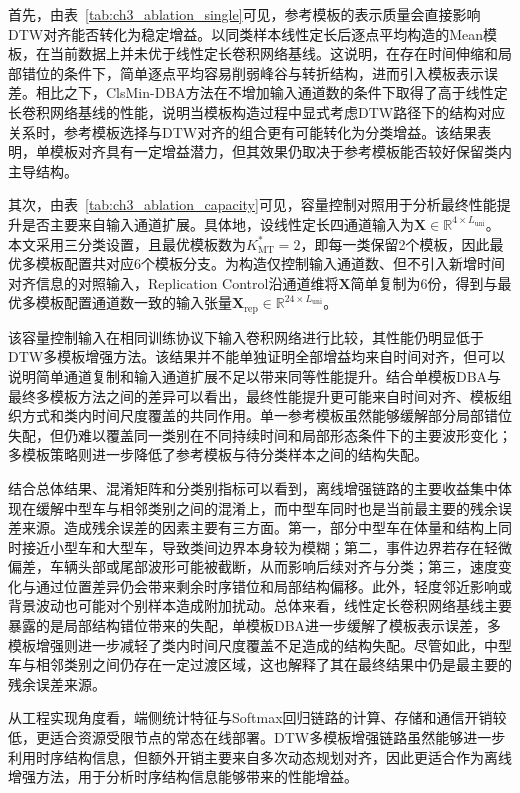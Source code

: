 \documentclass{xdupgthesis}
\begin{document}
首先，由表~\ref{tab:ch3_ablation_single}可见，参考模板的表示质量会直接影响DTW对齐能否转化为稳定增益。以同类样本线性定长后逐点平均构造的Mean模板，在当前数据上并未优于线性定长卷积网络基线。这说明，在存在时间伸缩和局部错位的条件下，简单逐点平均容易削弱峰谷与转折结构，进而引入模板表示误差。相比之下，ClsMin-DBA方法在不增加输入通道数的条件下取得了高于线性定长卷积网络基线的性能，说明当模板构造过程中显式考虑DTW路径下的结构对应关系时，参考模板选择与DTW对齐的组合更有可能转化为分类增益。该结果表明，单模板对齐具有一定增益潜力，但其效果仍取决于参考模板能否较好保留类内主导结构。

其次，由表~\ref{tab:ch3_ablation_capacity}可见，容量控制对照用于分析最终性能提升是否主要来自输入通道扩展。具体地，设线性定长四通道输入为$\mathbf{X}\in\mathbb{R}^{4\times L_{\mathrm{uni}}}$。本文采用三分类设置，且最优模板数为$K_{\mathrm{MT}}^\ast=2$，即每一类保留2个模板，因此最优多模板配置共对应6个模板分支。为构造仅控制输入通道数、但不引入新增时间对齐信息的对照输入，Replication Control沿通道维将$\mathbf{X}$简单复制为6份，得到与最优多模板配置通道数一致的输入张量$\mathbf{X}_{\mathrm{rep}}\in\mathbb{R}^{24\times L_{\mathrm{uni}}}$。

该容量控制输入在相同训练协议下输入卷积网络进行比较，其性能仍明显低于DTW多模板增强方法。该结果并不能单独证明全部增益均来自时间对齐，但可以说明简单通道复制和输入通道扩展不足以带来同等性能提升。结合单模板DBA与最终多模板方法之间的差异可以看出，最终性能提升更可能来自时间对齐、模板组织方式和类内时间尺度覆盖的共同作用。单一参考模板虽然能够缓解部分局部错位失配，但仍难以覆盖同一类别在不同持续时间和局部形态条件下的主要波形变化；多模板策略则进一步降低了参考模板与待分类样本之间的结构失配。

结合总体结果、混淆矩阵和分类别指标可以看到，离线增强链路的主要收益集中体现在缓解中型车与相邻类别之间的混淆上，而中型车同时也是当前最主要的残余误差来源。造成残余误差的因素主要有三方面。第一，部分中型车在体量和结构上同时接近小型车和大型车，导致类间边界本身较为模糊；第二，事件边界若存在轻微偏差，车辆头部或尾部波形可能被截断，从而影响后续对齐与分类；第三，速度变化与通过位置差异仍会带来剩余时序错位和局部结构偏移。此外，轻度邻近影响或背景波动也可能对个别样本造成附加扰动。总体来看，线性定长卷积网络基线主要暴露的是局部结构错位带来的失配，单模板DBA进一步缓解了模板表示误差，多模板增强则进一步减轻了类内时间尺度覆盖不足造成的结构失配。尽管如此，中型车与相邻类别之间仍存在一定过渡区域，这也解释了其在最终结果中仍是最主要的残余误差来源。

从工程实现角度看，端侧统计特征与Softmax回归链路的计算、存储和通信开销较低，更适合资源受限节点的常态在线部署。DTW多模板增强链路虽然能够进一步利用时序结构信息，但额外开销主要来自多次动态规划对齐，因此更适合作为离线增强方法，用于分析时序结构信息能够带来的性能增益。
\end{document}
